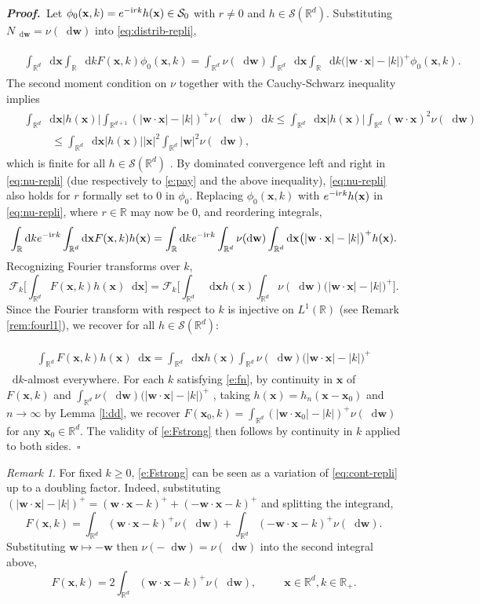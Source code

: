 \documentclass[11pt,A4,twoside]{article}
\numberwithin{equation}{section}
\renewcommand{\b}[1]{{\color{blue}#1}}
\newcommand{\F}{\mathcal{F}}
\renewcommand*\d{\mathop{}\!\mathrm{d}}
\newcommand{\x}{\mathbf{x}}
\newcommand{\w}{\mathbf{w}}
\newcommand{\R}{\mathbbm{R}}
\renewcommand{\S}{\mathcal{S}}
\newcommand{\intRd}{\int_{\R^d}}
\def\qqq{\;\;\;\;\;\;\;\;\;}
\def\bel{\begin{eqnarray*}\begin{aligned}}
\def\eel{\end{aligned}\end{eqnarray*}}
\newcommand{\beqa}{\begin{eqnarray}}
\newcommand{\eeqa}{\end{eqnarray}}
\def\bal{\begin{aligned}}
\def\eal{\end{aligned}}
\def\bll#1{
\beqa\label{#1}\bal
}\def\lel{\eal\eeqa}
\newcommand{\beql}[1]{\bll{#1}}
\newcommand{\eeql}{\lel}
\theoremstyle{definition}
\theoremstyle{remark}
\newtheorem{remark}{Remark}[section]
\def\R{\mathbb{R}}
\def\finproof {$\Box$ \vskip 5 pt }\def\finproof{\rule{4pt}{6pt}}\def\finproof{\ensuremath{\square}}
\def\proof{\noindent \emph{\textbf{Proof.} $\, $}}
\def\theh{\b{h}}\def\theh{h}
\def\thermi{{\rm i}}%
\begin{document}
{\proof Let $  \phi_0(\x,k) = e^{-\thermi rk} \theh(\x) \in \S_0 $ with $r\neq 0$ and $h\in\S(\R^d)$.  Substituting $N_{\d \w} = \nu(\d\w)$ into \eqref{eq:distrib-repli},
\beql{eq:nu-repli}
 &   \intRd \d \x \int_\R \d k F(\x,k) \phi_0(\x, k)=
    \int_{\R^d}  \nu(\d\w)%
    \intRd \d \x \int_\R \d k \big(|\w \cdot \x | -|k |\big)^+ \phi_0(\x,k).
\eeql
The second moment condition on $\nu$ together with the Cauchy-Schwarz inequality implies
\bel
    &\int_{\R^d} \d\x| \theh(\x) |\int_{\R^{d+1}} (|\w\cdot\x|  - |k|)^+  \nu(\d\w) \d k  \leq    \int_{\R^d} \d\x| \theh(\x) |\int_{\R^d} (\w\cdot\x)^2   \nu(\d\w) \\ &\qqq  \leq \int_{\R^d} \d\x | \theh(\x) |  |\x|^2\int_{\R^d} |\w|^2   \nu(\d\w),
\eel 
which is finite for all  $\theh \in \mathcal{S}(\R^d)$ \cite[Theorem page 141]{kanwal}.  By dominated convergence left and right in \eqref{eq:nu-repli} (due respectively to \eqref{e:pay} and the above inequality), \eqref{eq:nu-repli}  also holds for $r$ formally set to 0 in $\phi_0$.  Replacing $\phi_0(\x,k)$ with $e^{-\thermi rk} \theh(\x)$  in \eqref{eq:nu-repli}, where $r\in \R $ may now be 0, and reordering integrals,
 \begin{align*}
     \int_{\R} \d k e^{-\thermi rk} \intRd \d \x  F(\x,k) \theh(\x)
    = 
    \int_{\R} \d k e^{-\thermi rk}  \int_{\R^d}  \nu(\d\w) \intRd \d \x  \big(|\w \cdot \x | - |k |\big)^+ \theh(\x).
 \end{align*}
Recognizing Fourier transforms over $k$,
 \[ \F_{k} \Big[ 
    \int_{\R^{d} } F(\x,k) \theh(\x) \d\x \Big] 
    =
  \F_{k} \Big[  \int_{\R^d} \d\x \theh(\x) \int_{\R^{d}} \nu(\d\w)\big(|\w \cdot \x | - |k |\big)^+   \Big] 
  .\]
Since the Fourier transform with respect to $k$ is injective on $L^1(\R)$  (see Remark \ref{rem:fourl1}), we recover for all $\theh\in\mathcal{S}(\R^d)$:
\beql{e:fn}  
    \int_{\R^{d} } F(\x,k) \theh(\x) \d\x 
    =
   \int_{\R^d} \d\x \theh(\x) \int_{\R^{d}} \nu(\d\w)\big(|\w \cdot \x | - |k |\big)^+  \eeql
 $\d k$-almost everywhere.  For each $k$ satisfying \eqref{e:fn}, by continuity in $\x$ of $F(\x,k) $ and $\int_{\R^{d}} \nu(\d\w)\big(|\w \cdot \x | - |k |\big)^+$ , taking $h(\x) = h_n(\x-\x_0)$ and $n \to \infty$ by Lemma \ref{l:dd}, we recover $ F(\x_0 , k ) = \int_{\R^d} (|\w\cdot\x_0|  - |k| )^+ \nu(\d\w) $ for any $\x_0  \in\R^{d}$.  The validity of \eqref{e:Fstrong} then follows by continuity in $k$ applied to both sides.\ \finproof 

\begin{remark}\label{rem:doubling}
    For fixed $k\ge 0$, \eqref{e:Fstrong} can be seen as a variation of \eqref{eq:cont-repli} up to a doubling factor.  Indeed, substituting $ (|\w\cdot\x|  - |k| )^+ = (\w\cdot\x  - k )^+ + (-\w\cdot\x  - k )^+ $ and splitting the integrand,
\[
F(\x , k ) 
    =
   \int_{\R^d} (\w\cdot\x  - k )^+ \nu(\d\w) + \int_{\R^d} (-\w\cdot\x  - k )^+ \nu(\d\w).
\] 
Substituting $\w \mapsto -\w$ then $\nu(-\d\w) = \nu(\d\w)$ into the second integral above,
\[
    F(\x , k ) 
    =
   2\int_{\R^d} (\w\cdot\x  - k )^+ \nu(\d\w), \qqq \x\in\R^d, k\in\R_+.
\] 
\end{remark}

}
\end{document}
